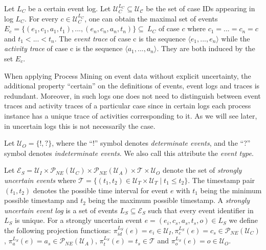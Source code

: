 \begin{definition}\label{def: certain traces}
Let $L_C$ be a certain event log. 
Let $\mathcal{U}_C^{L_C} \subseteq \mathcal{U_C}$ be the set of case IDs appearing in log $L_C$. 
For every $c \in \mathcal{U}_C^{L_C}$, one can obtain the maximal set of events $E_c = \{(e_1,c_1,a_1,t_1), ..., (e_n,c_n,a_n,t_n)\} \subseteq \ L_C$ of case $c$ where $c_1=...=c_n=c$ and $t_1<...<t_n$.
The \emph{event trace} of case c is the sequence $\langle e_1,...,e_n \rangle$ while the \emph{activity trace} of case c is the sequence $\langle a_1,...,a_n \rangle$.
They are both induced by the set $E_c$.
\end{definition}







When applying Process Mining on event data without explicit uncertainty, the additional property ``certain'' on the definitions of events, event logs and traces is redundant.
Moreover, in such logs one does not need to distinguish between event traces and activity traces of a particular case since in certain logs each process instance has a unique trace of activities corresponding to it.
As we will see later, in uncertain logs this is not necessarily the case.


\begin{definition}
Let $\mathcal{U}_O = \{!, ?\}$, where the ``!'' symbol denotes \emph{determinate events}, and the ``?'' symbol denotes \emph{indeterminate events}.
We also call this attribute the \emph{event type}.
\end{definition}




\begin{definition}
Let $\mathcal{E}_S=\mathcal{U}_I \times \mathcal{P}_{NE}(\mathcal{U}_C) \times \mathcal{P}_{NE}(\mathcal{U}_A) \times \mathcal{T} \times \mathcal{U}_O$ denote the set of \emph{strongly uncertain events} where $\mathcal{T} = \{(t_1,t_2) \in \mathcal{U}_T \times \mathcal{U}_T \mid t_1 \leq t_2\}$.
The timestamp pair $(t_1,t_2)$ denotes the possible time interval for event $e$ with $t_1$ being the minimum possible timestamp and $t_2$ being the maximum possible timestamp.
A \emph{strongly uncertain event log} is a set of events $L_S \subseteq \mathcal{E}_S$ such that every event identifier in $L_S$ is unique.
For a strongly uncertain event $e=(e_i,c_s,a_s,t_s,o) \in L_S$ we define the following projection functions: 
$\pi_{id}^{L_S}(e)=e_i \in \mathcal{U}_I, 
\pi_c^{L_S}(e)=c_s \in \mathcal{P}_{NE}(\mathcal{U}_C)$, 
$\pi_a^{L_S}(e)=a_s \in \mathcal{P}_{NE}(\mathcal{U}_A)$, 
$\pi_t^{L_S}(e)=t_s \in \mathcal{T}$ and 
$\pi^{L_S}_o(e)=o \in \mathcal{U}_O$. 
\end{definition}


